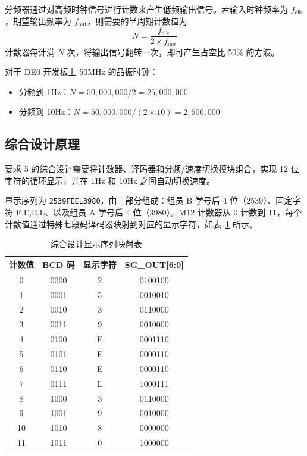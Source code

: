 \documentclass[12pt]{ctexart}
\begin{document}
分频器通过对高频时钟信号进行计数来产生低频输出信号。若输入时钟频率为 $f_{\text{clk}}$，期望输出频率为 $f_{\text{out}}$，则需要的半周期计数值为
\[
    N = \frac{f_{\text{clk}}}{2 \times f_{\text{out}}}
\]
计数器每计满 $N$ 次，将输出信号翻转一次，即可产生占空比 50\% 的方波。

对于 DE0 开发板上 50MHz 的晶振时钟：
\begin{itemize}
    \item 分频到 1Hz：$N = 50{,}000{,}000 / 2 = 25{,}000{,}000$
    \item 分频到 10Hz：$N = 50{,}000{,}000 / (2 \times 10) = 2{,}500{,}000$
\end{itemize}

\subsection{综合设计原理}

要求 5 的综合设计需要将计数器、译码器和分频/速度切换模块组合，实现 12 位字符的循环显示，并在 1Hz 和 10Hz 之间自动切换速度。

显示序列为 \texttt{2539FEEL3980}，由三部分组成：组员 B 学号后 4 位（2539）、固定字符 F,E,E,L、以及组员 A 学号后 4 位（3980）。M12 计数器从 0 计数到 11，每个计数值通过特殊七段码译码器映射到对应的显示字符，如表~\ref{tab:display_map} 所示。

\begin{table}[H]
    \centering
    \caption{综合设计显示序列映射表}
    \label{tab:display_map}
    \begin{tabular}{cccc}
        \toprule
        \textbf{计数值} & \textbf{BCD 码} & \textbf{显示字符} & \textbf{SG\_OUT[6:0]} \\
        \midrule
        0  & 0000 & 2 & 0100100 \\
        1  & 0001 & 5 & 0010010 \\
        2  & 0010 & 3 & 0110000 \\
        3  & 0011 & 9 & 0010000 \\
        4  & 0100 & F & 0001110 \\
        5  & 0101 & E & 0000110 \\
        6  & 0110 & E & 0000110 \\
        7  & 0111 & L & 1000111 \\
        8  & 1000 & 3 & 0110000 \\
        9  & 1001 & 9 & 0010000 \\
        10 & 1010 & 8 & 0000000 \\
        11 & 1011 & 0 & 1000000 \\
        \bottomrule
    \end{tabular}
\end{table}
\end{document}

